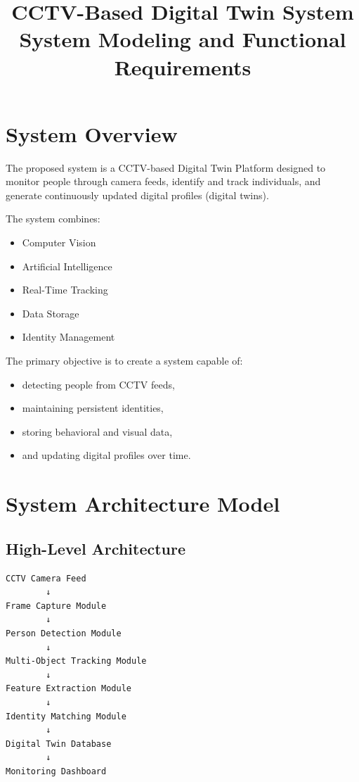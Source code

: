\documentclass[12pt,a4paper]{article}
\title{CCTV-Based Digital Twin System\\
System Modeling and Functional Requirements}
\author{}
\date{}
\begin{document}
\maketitle

\section{System Overview}

The proposed system is a CCTV-based Digital Twin Platform designed to monitor people through camera feeds, identify and track individuals, and generate continuously updated digital profiles (digital twins).

The system combines:
\begin{itemize}
    \item Computer Vision
    \item Artificial Intelligence
    \item Real-Time Tracking
    \item Data Storage
    \item Identity Management
\end{itemize}

The primary objective is to create a system capable of:
\begin{itemize}
    \item detecting people from CCTV feeds,
    \item maintaining persistent identities,
    \item storing behavioral and visual data,
    \item and updating digital profiles over time.
\end{itemize}

\section{System Architecture Model}

\subsection{High-Level Architecture}

\begin{verbatim}
CCTV Camera Feed
        ↓
Frame Capture Module
        ↓
Person Detection Module
        ↓
Multi-Object Tracking Module
        ↓
Feature Extraction Module
        ↓
Identity Matching Module
        ↓
Digital Twin Database
        ↓
Monitoring Dashboard
\end{verbatim}
\end{document}
